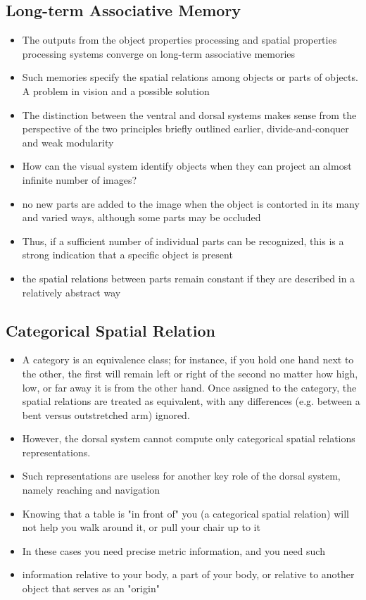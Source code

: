 \documentclass[12pt]{article}
\begin{document}
\subsection{Long-term Associative Memory}

\begin{itemize}

\item The outputs from the object properties processing and spatial properties processing systems converge on long-term associative memories
\item Such memories specify the spatial relations among objects or parts of objects. A problem in vision and a possible solution
\item The distinction between the ventral and dorsal systems makes sense from the perspective of the two principles briefly outlined earlier, divide-and-conquer and weak modularity
\item How can the visual system identify objects when they can project an almost infinite number of images?
\item no new parts are added to the image when the object is contorted in its many and varied ways, although some parts may be occluded
\item Thus, if a sufficient number of individual parts can be recognized, this is a strong indication that a specific object is present
\item the spatial relations between parts remain constant if they are described in a relatively abstract way
\end{itemize}

\subsection{Categorical Spatial Relation}

\begin{itemize}

\item A category is an equivalence class; for instance, if you hold one hand next to the other, the first will remain left or right of the second no matter how high, low, or far away it is from the other hand. Once assigned to the category, the spatial relations are treated as equivalent, with any differences (e.g. between a bent versus outstretched arm) ignored.
\item However, the dorsal system cannot compute only categorical spatial relations representations.
\item Such representations are useless for another key role of the dorsal system, namely reaching and navigation
\item Knowing that a table is "in front of" you (a categorical spatial relation) will not help you walk around it, or pull your chair up to it
\item In these cases you need precise metric information, and you need such
\item information relative to your body, a part of your body, or relative to another object that serves as an "origin"
\end{itemize}
\end{document}
